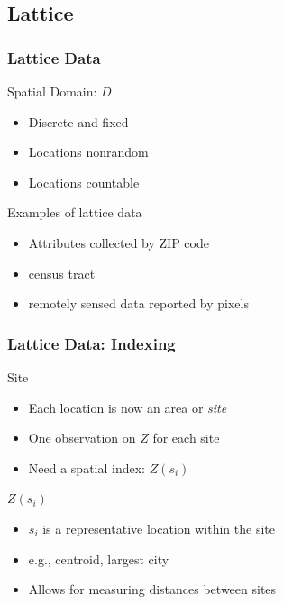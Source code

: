\documentclass[nototal]{beamer}
\begin{document}
\subsection{Lattice}
\begin{frame}[<+->]
  \frametitle{Lattice Data}
  \begin{block}{Spatial Domain: $D$ }
    \begin{itemize}
      \item Discrete and fixed
      \item Locations nonrandom
      \item Locations countable
    \end{itemize}
   \end{block}
\begin{block}{Examples of lattice data}
    \begin{itemize}
      \item Attributes collected by ZIP code
      \item census tract
      \item remotely sensed data reported by pixels
    \end{itemize}
   \end{block}
 \end{frame}
\begin{frame}[<+->]
  \frametitle{Lattice Data: Indexing}
  \begin{block}{Site }
    \begin{itemize}
      \item Each location is now an area or \emph{site}
      \item One observation on $Z$ for each site
      \item Need a spatial index: $Z(s_i)$
    \end{itemize}
   \end{block}
\begin{block}{$Z(s_i)$}
    \begin{itemize}
      \item $s_i$ is a representative location within the site
      \item e.g., centroid, largest city
      \item Allows for measuring distances between sites
    \end{itemize}
   \end{block}
 \end{frame}
\end{document}
